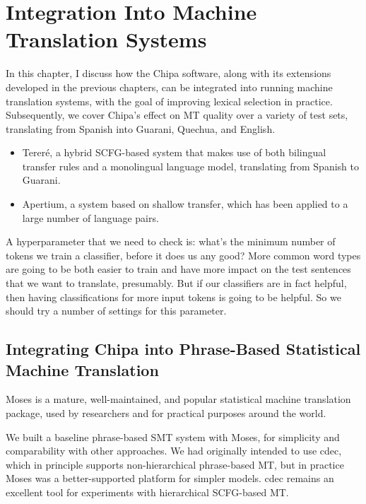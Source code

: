 \chapter{Integration Into Machine Translation Systems}
\label{chap:integration}

In this chapter, I discuss how the Chipa software, along with its extensions
developed in the previous chapters, can be integrated into running machine
translation systems, with the goal of improving lexical selection in practice.
Subsequently, we cover Chipa's effect on MT quality over a variety of test
sets, translating from Spanish into Guarani, Quechua, and English.

\begin{itemize}
\item Tereré, a hybrid SCFG-based system that makes use of both bilingual
transfer rules and a monolingual language model, translating from Spanish to
Guarani.

\item Apertium, a system based on shallow transfer, which has been
applied to a large number of language pairs.
\end{itemize}

A hyperparameter that we need to check is: what's the minimum number of tokens
we train a classifier, before it does us any good?
More common word types are going to be both easier to train and have more
impact on the test sentences that we want to translate, presumably. But if our
classifiers are in fact helpful, then having classifications for more input
tokens is going to be helpful.
So we should try a number of settings for this parameter.

\section{Integrating Chipa into Phrase-Based Statistical Machine Translation}
\label{sec:terere}
Moses \cite{koehn-EtAl:2007:PosterDemo} is a mature, well-maintained, and
popular statistical machine translation package, used by researchers and for
practical purposes around the world.

We built a baseline phrase-based SMT system with Moses, for simplicity and
comparability with other approaches. We had originally intended to use cdec,
which in principle supports non-hierarchical phrase-based MT, but in practice
Moses was a better-supported platform for simpler models. cdec remains an
excellent tool for experiments with hierarchical SCFG-based MT.

